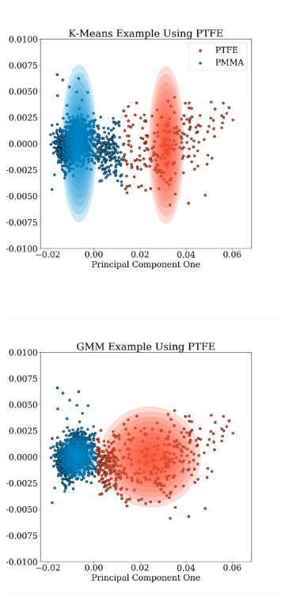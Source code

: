 \documentclass[a4paper,11pt]{article}
\begin{document}
\begin{figure}[t!]
    \centering
    \begin{subfigure}[b]{0.48\textwidth}
        \includegraphics[width=\textwidth]{figures/Kmeans.png}
    \end{subfigure}
    ~ %
    \begin{subfigure}[b]{0.48\textwidth}
        \includegraphics[width=\textwidth]{figures/GMM.png}
    \end{subfigure}


\end{figure}
\end{document}
